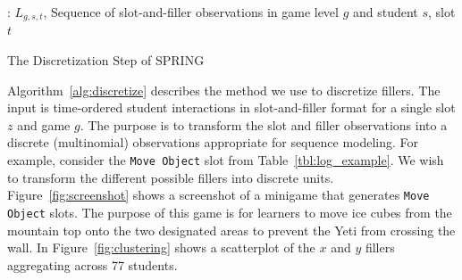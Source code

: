 \documentclass{sigchi}
\def\algname{SPRING\xspace}
\begin{document}
\begin{algorithm}[ht]
	\begin{algorithmic}[1]
		\Require: $L_{g,s,t}$, Sequence of slot-and-filler observations in game level $g$ and student $s$, slot $t$
		
	
		\State
					\EndIf
				\EndFor
		\EndFor
		\State {}
		\EndProcedure
		
	\end{algorithmic}
	\caption{The Discretization Step of \algname \label{alg:discretize}}
\end{algorithm}


Algorithm~\ref{alg:discretize} describes the method we use to discretize fillers.
The input is time-ordered student interactions in slot-and-filler format for a single slot $z$ and game $g$.
The purpose is to transform the slot and filler observations into a discrete (multinomial) observations appropriate for sequence modeling.
For example, consider the \texttt{Move Object} slot from Table~\ref{tbl:log_example}.
We wish to transform the different possible fillers into discrete units.
Figure~\ref{fig:screenshot} shows a screenshot of a minigame that generates  \texttt{Move Object} slots.
The purpose of this game is for learners to move ice cubes from the mountain top onto the two designated areas to prevent the Yeti from crossing the wall.
In Figure~\ref{fig:clustering} shows a scatterplot of the $x$ and $y$ fillers aggregating across 77 students.
\end{document}

